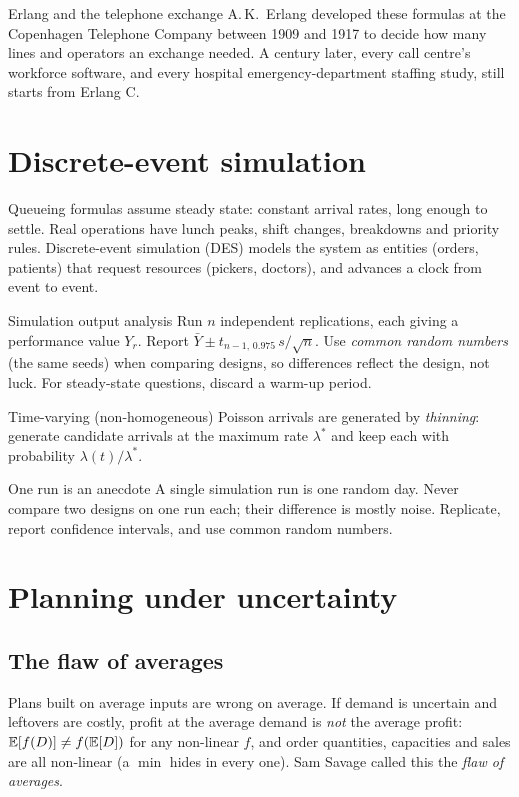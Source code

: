 \begin{realcase}{Erlang and the telephone exchange}
A.\,K.\ Erlang developed these formulas at the Copenhagen Telephone Company between 1909 and 1917 to decide how many
lines and operators an exchange needed. A century later, every call centre's workforce software, and every hospital
emergency-department staffing study, still starts from Erlang C.
\end{realcase}

\section{Discrete-event simulation}
Queueing formulas assume steady state: constant arrival rates, long enough to settle. Real operations have lunch
peaks, shift changes, breakdowns and priority rules. Discrete-event simulation (DES) models the system as entities
(orders, patients) that request resources (pickers, doctors), and advances a clock from event to event.

\begin{keyformula}{Simulation output analysis}
Run $n$ independent replications, each giving a performance value $Y_r$. Report
$\bar Y\pm t_{n-1,\,0.975}\,s/\sqrt n$. Use \emph{common random numbers} (the same seeds) when comparing designs, so
differences reflect the design, not luck. For steady-state questions, discard a warm-up period.
\end{keyformula}

Time-varying (non-homogeneous) Poisson arrivals are generated by \emph{thinning}: generate candidate arrivals at the
maximum rate $\lambda^*$ and keep each with probability $\lambda(t)/\lambda^*$.

\begin{pitfall}{One run is an anecdote}
A single simulation run is one random day. Never compare two designs on one run each; their difference is mostly
noise. Replicate, report confidence intervals, and use common random numbers.
\end{pitfall}

\section{Planning under uncertainty}
\subsection{The flaw of averages}
Plans built on average inputs are wrong on average. If demand is uncertain and leftovers are costly, profit at the
average demand is \emph{not} the average profit: $\mathbb{E}[f(D)]\ne f(\mathbb{E}[D])$ for any non-linear $f$, and order quantities,
capacities and sales are all non-linear (a $\min$ hides in every one). Sam Savage called this the \emph{flaw of averages}.


